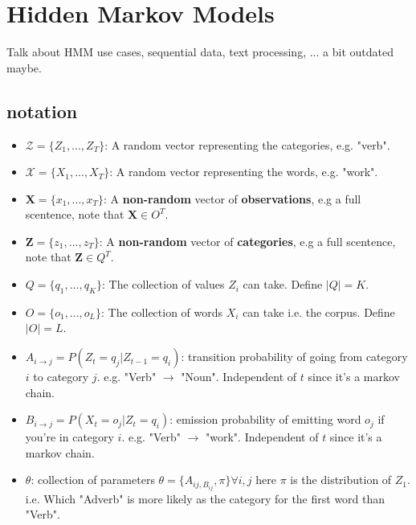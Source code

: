 \renewcommand{\this}{HMM_EM}

\chapter{Hidden Markov Models}

Talk about HMM use cases, sequential data, text processing, ... a bit outdated maybe.

\section{notation}
\begin{itemize}
\item $\mathcal{Z} = \{Z_1, ..., Z_T\}$: A random vector representing the categories, e.g. "verb".

\item $\mathcal{X} = \{X_1, ..., X_T\}$: A random vector representing the words, e.g. "work".

\item $\textbf{X}=\{x_1,...,x_T\}$: A \textbf{non-random} vector of \textbf{observations}, e.g a full scentence, note that $\textbf{X} \in O^T$.
		
\item $\textbf{Z}=\{z_1,...,z_T\}$: A \textbf{non-random} vector of \textbf{categories}, e.g a full scentence, note that $\textbf{Z} \in Q^T$.
		
\item $Q=\{q_1,...,q_K\}$: The collection of values $Z_i$ can take. Define $|Q|=K$.
		
\item $O=\{o_1,...,o_L\}$: The collection of words $X_i$ can take i.e. the corpus. Define $|O|=L$.

\item $A_{i\rightarrow j} = P(Z_t = q_j| Z_{t-1}=q_i)$: transition probability of going from category $i$ to category $j$. e.g. "Verb" $\to$ "Noun". Independent of $t$ since it's a markov chain.
		
\item $B_{i\rightarrow j} = P(X_t = o_j|Z_t = q_i)$: emission probability of emitting word $o_j$ if you're in category $i$. e.g. "Verb" $\to$ "work". Independent of $t$ since it's a markov chain.
		
\item $\theta$: collection of parameters $\theta = \{A_{ij,B_{ij}}, \pi\} \forall i,j$ here $\pi$ is the distribution of $Z_1$. i.e. Which "Adverb" is more likely as the category for the first word than "Verb".

\end{itemize}

